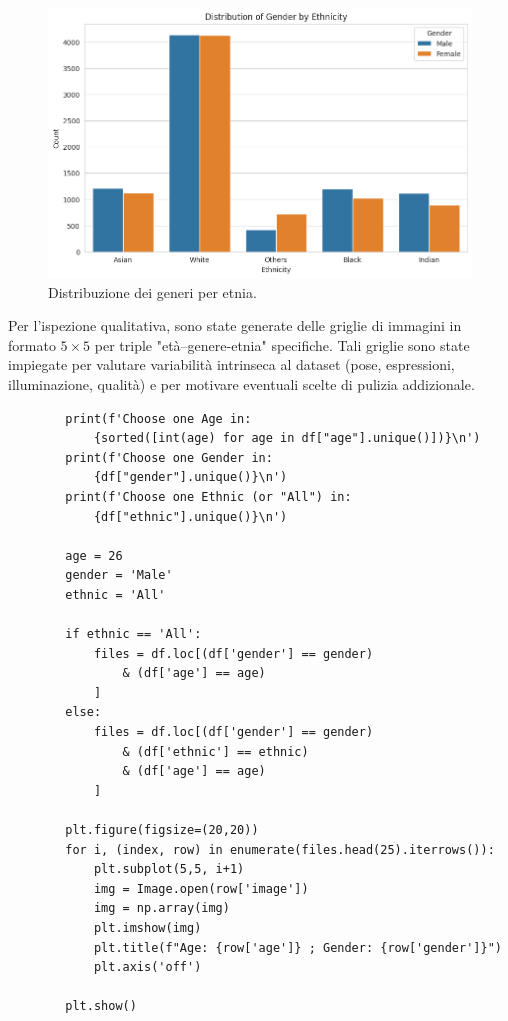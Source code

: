 \documentclass[a4paper,12pt]{report}
\begin{document}
	\begin{figure}[H]
		\centering
		\includegraphics[width=1.0\textwidth]{img/ethnic_bygender_image.png}
		\caption{Distribuzione dei generi per etnia.}
	\end{figure}
	
	Per l'ispezione qualitativa, sono state generate delle griglie di immagini in formato $5\times5$ per triple "età–genere-etnia" specifiche. Tali griglie sono state impiegate per valutare variabilità intrinseca al dataset (pose, espressioni, illuminazione, qualità) e per motivare eventuali scelte di pulizia addizionale.
	
	\begin{verbatim}
		print(f'Choose one Age in: 
			{sorted([int(age) for age in df["age"].unique()])}\n')
		print(f'Choose one Gender in: 
			{df["gender"].unique()}\n')
		print(f'Choose one Ethnic (or "All") in: 
			{df["ethnic"].unique()}\n')
		
		age = 26
		gender = 'Male'
		ethnic = 'All'
		
		if ethnic == 'All':
			files = df.loc[(df['gender'] == gender) 
				& (df['age'] == age)
			]
		else:
			files = df.loc[(df['gender'] == gender) 
				& (df['ethnic'] == ethnic) 
				& (df['age'] == age)
			]
		
		plt.figure(figsize=(20,20))
		for i, (index, row) in enumerate(files.head(25).iterrows()):
			plt.subplot(5,5, i+1)
			img = Image.open(row['image'])
			img = np.array(img)
			plt.imshow(img)
			plt.title(f"Age: {row['age']} ; Gender: {row['gender']}")
			plt.axis('off')
		
		plt.show()
	\end{verbatim}
	
\end{document}
